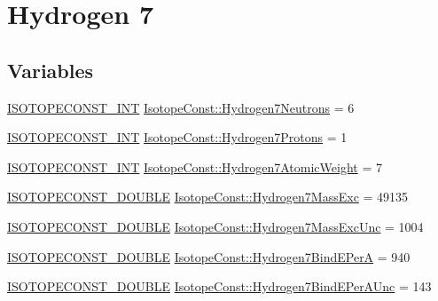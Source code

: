 \hypertarget{group___isotope_const-_hydrogen-_h7}{}\section{Hydrogen 7}
\label{group___isotope_const-_hydrogen-_h7}
\subsection*{Variables}
\begin{DoxyCompactItemize}
\item 
\mbox{\hyperlink{group___isotope_const-_macros_ga5f18360b3e99483a35c32d789e62621c}{I\+S\+O\+T\+O\+P\+E\+C\+O\+N\+S\+T\+\_\+\+I\+NT}} \mbox{\hyperlink{group___isotope_const-_hydrogen-_h7_ga1e5cbc1310d8cecf8198ea68e9d5fa4a}{Isotope\+Const\+::\+Hydrogen7\+Neutrons}} = 6
\item 
\mbox{\hyperlink{group___isotope_const-_macros_ga5f18360b3e99483a35c32d789e62621c}{I\+S\+O\+T\+O\+P\+E\+C\+O\+N\+S\+T\+\_\+\+I\+NT}} \mbox{\hyperlink{group___isotope_const-_hydrogen-_h7_ga52d491eb2166236933273ab7e0287252}{Isotope\+Const\+::\+Hydrogen7\+Protons}} = 1
\item 
\mbox{\hyperlink{group___isotope_const-_macros_ga5f18360b3e99483a35c32d789e62621c}{I\+S\+O\+T\+O\+P\+E\+C\+O\+N\+S\+T\+\_\+\+I\+NT}} \mbox{\hyperlink{group___isotope_const-_hydrogen-_h7_ga6d2eb0a255e8a1b0ccf252af13e2f1ba}{Isotope\+Const\+::\+Hydrogen7\+Atomic\+Weight}} = 7
\item 
\mbox{\hyperlink{group___isotope_const-_macros_ga8f45a7272ce02c0b4c65c44636ed719a}{I\+S\+O\+T\+O\+P\+E\+C\+O\+N\+S\+T\+\_\+\+D\+O\+U\+B\+LE}} \mbox{\hyperlink{group___isotope_const-_hydrogen-_h7_gafaf0bddeeb98eac6ea4612d3542e7af4}{Isotope\+Const\+::\+Hydrogen7\+Mass\+Exc}} = 49135
\item 
\mbox{\hyperlink{group___isotope_const-_macros_ga8f45a7272ce02c0b4c65c44636ed719a}{I\+S\+O\+T\+O\+P\+E\+C\+O\+N\+S\+T\+\_\+\+D\+O\+U\+B\+LE}} \mbox{\hyperlink{group___isotope_const-_hydrogen-_h7_ga8afcd48f41a65548b7272de981946a26}{Isotope\+Const\+::\+Hydrogen7\+Mass\+Exc\+Unc}} = 1004
\item 
\mbox{\hyperlink{group___isotope_const-_macros_ga8f45a7272ce02c0b4c65c44636ed719a}{I\+S\+O\+T\+O\+P\+E\+C\+O\+N\+S\+T\+\_\+\+D\+O\+U\+B\+LE}} \mbox{\hyperlink{group___isotope_const-_hydrogen-_h7_gacda7afc9b251e957b6bc5b98345dfb99}{Isotope\+Const\+::\+Hydrogen7\+Bind\+E\+PerA}} = 940
\item 
\mbox{\hyperlink{group___isotope_const-_macros_ga8f45a7272ce02c0b4c65c44636ed719a}{I\+S\+O\+T\+O\+P\+E\+C\+O\+N\+S\+T\+\_\+\+D\+O\+U\+B\+LE}} \mbox{\hyperlink{group___isotope_const-_hydrogen-_h7_ga160ef922ae1ec0ddcc5cf6d6bf735d88}{Isotope\+Const\+::\+Hydrogen7\+Bind\+E\+Per\+A\+Unc}} = 143

\end{DoxyCompactItemize}
